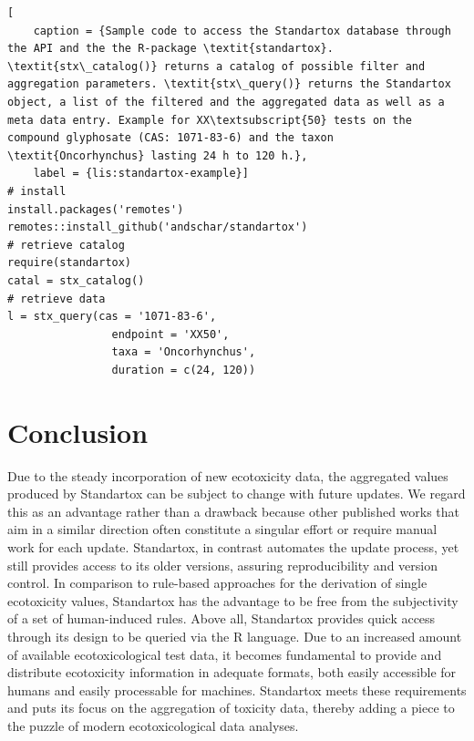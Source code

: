 \documentclass[journal,datadescriptor,accept,moreauthors,pdftex]{Definitions/mdpi}
\begin{document}
\begin{lstlisting}[
    caption = {Sample code to access the Standartox database through the API and the the R-package \textit{standartox}. \textit{stx\_catalog()} returns a catalog of possible filter and aggregation parameters. \textit{stx\_query()} returns the Standartox object, a list of the filtered and the aggregated data as well as a meta data entry. Example for XX\textsubscript{50} tests on the compound glyphosate (CAS: 1071-83-6) and the taxon \textit{Oncorhynchus} lasting 24 h to 120 h.},
    label = {lis:standartox-example}]
# install
install.packages('remotes')
remotes::install_github('andschar/standartox')
# retrieve catalog    
require(standartox)
catal = stx_catalog()
# retrieve data
l = stx_query(cas = '1071-83-6',
                endpoint = 'XX50',
                taxa = 'Oncorhynchus',
                duration = c(24, 120))
\end{lstlisting}

\section{Conclusion}
Due to the steady incorporation of new ecotoxicity data, the aggregated values produced by Standartox can be subject to change with future updates. We regard this as an advantage rather than a drawback because other published works that aim in a similar direction often constitute a singular effort or require manual work for each update. Standartox, in contrast automates the update process, yet still provides access to its older versions, assuring reproducibility and version control. In comparison to rule-based approaches for the derivation of single ecotoxicity values, Standartox has the advantage to be free from the subjectivity of a set of human-induced rules. Above all, Standartox provides quick access through its design to be queried via the R language. Due to an increased amount of available ecotoxicological test data, it becomes fundamental to provide and distribute ecotoxicity information in adequate formats, both easily accessible for humans and easily processable for machines. Standartox meets these requirements and puts its focus on the aggregation of toxicity data, thereby adding a piece to the puzzle of modern ecotoxicological data analyses.

\vspace{6pt} 
\end{document}
